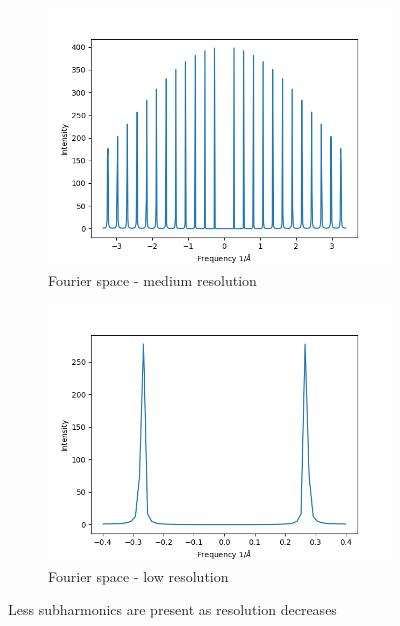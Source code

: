 \documentclass{article}
\begin{document}
\begin{figure}[h]
\begin{subfigure}{0.33\textwidth}
        \end{subfigure}
        \begin{subfigure}{0.33\textwidth}
                \centering
                \includegraphics[width=\textwidth]{fourier_delta_1d_medres}
                \caption{Fourier space - medium resolution}\label{fourier_delta_1d_medres}
        \end{subfigure}
        \begin{subfigure}{0.33\textwidth}
                \centering
                \includegraphics[width=\textwidth]{fourier_delta_1d_lowres}
                \caption{Fourier space - low resolution}\label{fourier_delta_1d_lowres}
        \end{subfigure}
	\caption{Less subharmonics are present as resolution decreases}\label{fig:1D_deltas}
\end{figure}
\end{document}
